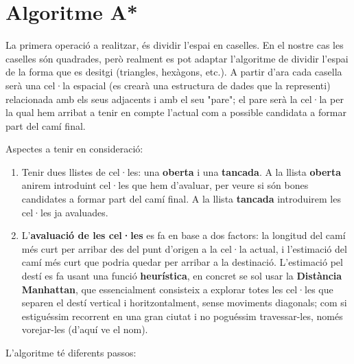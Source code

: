 \documentclass[12pt]{article}
\begin{document}
\clearpage
\section{Algoritme A*\label{ann:a_star}}
La primera operació a realitzar, és dividir l'espai en caselles. En el nostre cas les caselles són quadrades, però realment es pot adaptar l'algoritme de dividir l'espai de la forma que es desitgi (triangles, hexàgons, etc.). A partir d'ara cada casella serà una cel·la espacial (es crearà una estructura de dades que la representi) relacionada amb els seus adjacents i amb el seu "pare"; el pare serà la cel·la per la qual hem arribat a tenir en compte l'actual com a possible candidata a formar part del camí final.

Aspectes a tenir en consideració:

\begin{enumerate}
	\item Tenir dues llistes de cel·les: una \textbf{oberta} i una \textbf{tancada}. A la llista \textbf{oberta} anirem introduint cel·les que hem d'avaluar, per veure si són bones candidates a formar part del camí final. A la llista \textbf{tancada} introduirem les cel·les ja avaluades.

	\item L'\textbf{avaluació de les cel·les} es fa en base a dos factors: la longitud del camí més curt per arribar des del punt d'origen a la cel·la actual, i l'estimació del camí més curt que podria quedar per arribar a la destinació. L'estimació pel destí es fa usant una funció \textbf{heurística}, en concret se sol usar la \textbf{Distància Manhattan}, que essencialment consisteix a explorar totes les cel·les que separen el destí vertical i horitzontalment, sense moviments diagonals; com si estiguéssim recorrent  en una gran ciutat i no poguéssim travessar-les, només vorejar-les (d'aquí ve el nom).
\end{enumerate}

L'algoritme té diferents passos:
\end{document}
